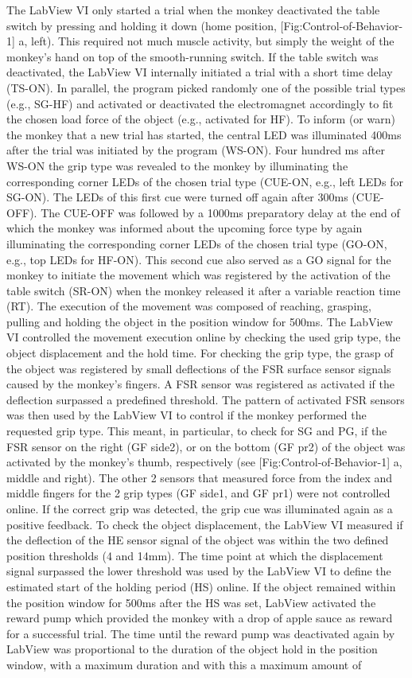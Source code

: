 The LabView VI only started a trial when the monkey deactivated the table switch by pressing and holding it down (home position, [Fig:Control-of-Behavior-1] a, left). This required not much muscle activity, but simply the weight of the monkey's hand on top of the smooth-running switch. If the table switch was deactivated, the LabView VI internally initiated a trial with a short time delay (TS-ON). In parallel, the program picked randomly one of the possible trial types (e.g., SG-HF) and activated or deactivated the electromagnet accordingly to fit the chosen load force of the object (e.g., activated for HF). To inform (or warn) the monkey that a new trial has started, the central LED was illuminated 400ms after the trial was initiated by the program (WS-ON). Four hundred ms after WS-ON the grip type was revealed to the monkey by illuminating the corresponding corner LEDs of the chosen trial type (CUE-ON, e.g., left LEDs for SG-ON). The LEDs of this first cue were turned off again after 300ms (CUE-OFF). The CUE-OFF was followed by a 1000ms preparatory delay at the end of which the monkey was informed about the upcoming force type by again illuminating the corresponding corner LEDs of the chosen trial type (GO-ON, e.g., top LEDs for HF-ON). This second cue also served as a GO signal for the monkey to initiate the movement which was registered by the activation of the table switch (SR-ON) when the monkey released it after a variable reaction time (RT). The execution of the movement was composed of reaching, grasping, pulling and holding the object in the position window for 500ms. The LabView VI controlled the movement execution online by checking the used grip type, the object displacement and the hold time. For checking the grip type, the grasp of the object was registered by small deflections of the FSR surface sensor signals caused by the monkey's fingers. A FSR sensor was registered as activated if the deflection surpassed a predefined threshold. The pattern of activated FSR sensors was then used by the LabView VI to control if the monkey performed the requested grip type. This meant, in particular, to check for SG and PG, if the FSR sensor on the right (GF side2), or on the bottom (GF pr2) of the object was activated by the monkey's thumb, respectively (see [Fig:Control-of-Behavior-1] a, middle and right). The other 2 sensors that measured force from the index and middle fingers for the 2 grip types (GF side1, and GF pr1) were not controlled online. If the correct grip was detected, the grip cue was illuminated again as a positive feedback. To check the object displacement, the LabView VI measured if the deflection of the HE sensor signal of the object was within the two defined position thresholds (4 and 14mm). The time point at which the displacement signal surpassed the lower threshold was used by the LabView VI to define the estimated start of the holding period (HS) online. If the object remained within the position window for 500ms after the HS was set, LabView activated the reward pump which provided the monkey with a drop of apple sauce as reward for a successful trial. The time until the reward pump was deactivated again by LabView was proportional to the duration of the object hold in the position window, with a maximum duration and with this a maximum amount of 
